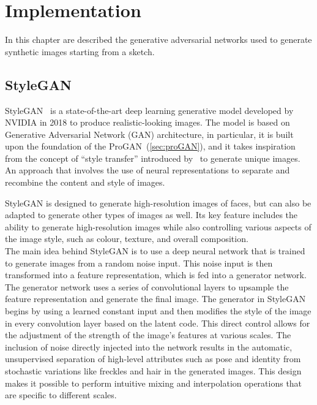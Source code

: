 \newpage
\section{Implementation}
\label{sec:used GAN discussion}
In this chapter are described the generative adversarial networks used to generate synthetic images starting from a sketch. 
\subsection{StyleGAN}
\label{section:StyleGAN}
StyleGAN~\cite{StyleGAN} is a state-of-the-art deep learning generative model developed by NVIDIA in 2018 to produce realistic-looking images. The model is based on Generative Adversarial Network (GAN) architecture, in particular, it is built upon the foundation of the ProGAN~(\ref{sec:proGAN}), and it takes inspiration from the concept of “style transfer” introduced by~\cite{ImageStyleTransfer} to generate unique images. An approach that involves the use of neural representations to separate and recombine the content and style of images.

\noindent StyleGAN is designed to generate high-resolution images of faces, but can also be adapted to generate other types of images as well. Its key feature includes the ability to generate high-resolution images while also controlling various aspects of the image style, such as colour, texture, and overall composition. \\

\noindent The main idea behind StyleGAN is to use a deep neural network that is trained to generate images from a random noise input. This noise input is then transformed into a feature representation, which is fed into a generator network. The generator network uses a series of convolutional layers to upsample the feature representation and generate the final image. 
The generator in StyleGAN begins by using a learned constant input and then modifies the style of the image in every convolution layer based on the latent code. This direct control allows for the adjustment of the strength of the image's features at various scales. 
The inclusion of noise directly injected into the network results in the automatic, unsupervised separation of high-level attributes such as pose and identity from stochastic variations like freckles and hair in the generated images. This design makes it possible to perform intuitive mixing and interpolation operations that are specific to different scales.

